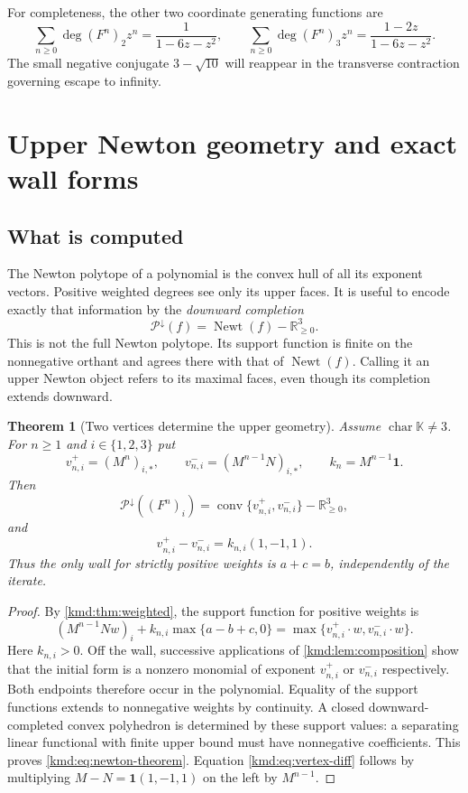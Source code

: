 \documentclass[11pt,a4paper]{article}
\numberwithin{equation}{section}
\newtheorem{theorem}{Theorem}[section]
\theoremstyle{definition}
\theoremstyle{remark}
\newcommand{\K}{\mathbb K}
\newcommand{\R}{\mathbb R}
\newcommand{\one}{\mathbf 1}
\newcommand{\dd}{\operatorname{deg}}
\newcommand{\Newt}{\operatorname{Newt}}
\newcommand{\conv}{\operatorname{conv}}
\DeclareMathOperator{\charac}{char}
\begin{document}
For completeness, the other two coordinate generating functions are
\[
 \sum_{n\ge0}\dd(F^n)_2z^n=\frac1{1-6z-z^2},\qquad
 \sum_{n\ge0}\dd(F^n)_3z^n=\frac{1-2z}{1-6z-z^2}.
\]
The small negative conjugate $3-\sqrt{10}$ will reappear in the
transverse contraction governing escape to infinity.

\section{Upper Newton geometry and exact wall forms}\label{kmd:sec:newton}

\subsection{What is computed}
The Newton polytope of a polynomial is the convex hull of all its
exponent vectors. Positive weighted degrees see only its upper
faces. It is useful to encode exactly that information by the
\emph{downward completion}
\begin{equation}
 \mathcal P^\downarrow(f)=\Newt(f)-\R_{\ge0}^3.
 \label{kmd:eq:downward}
\end{equation}
This is not the full Newton polytope. Its support function is finite
on the nonnegative orthant and agrees there with that of
$\Newt(f)$. Calling it an upper Newton object refers to its maximal
faces, even though its completion extends downward.

\begin{theorem}[Two vertices determine the upper geometry]\label{kmd:thm:newton}
Assume $\charac\K\ne3$. For $n\ge1$ and $i\in\{1,2,3\}$ put
\begin{equation}
 v^+_{n,i}=(M^n)_{i,*},\qquad
 v^-_{n,i}=(M^{n-1}N)_{i,*},\qquad k_n=M^{n-1}\one.
 \label{kmd:eq:vertices}
\end{equation}
Then
\begin{equation}
 \mathcal P^\downarrow((F^n)_i)
 =\conv\{v^+_{n,i},v^-_{n,i}\}-\R_{\ge0}^3,
 \label{kmd:eq:newton-theorem}
\end{equation}
and
\begin{equation}
 v^+_{n,i}-v^-_{n,i}=k_{n,i}(1,-1,1).
 \label{kmd:eq:vertex-diff}
\end{equation}
Thus the only wall for strictly positive weights is $a+c=b$,
independently of the iterate.
\end{theorem}
\begin{proof}
By \cref{kmd:thm:weighted}, the support function for positive weights is
\[
 (M^{n-1}Nw)_i+k_{n,i}\max\{a-b+c,0\}
 =\max\{v^+_{n,i}\cdot w,v^-_{n,i}\cdot w\}.
\]
Here $k_{n,i}>0$. Off the wall, successive applications of
\cref{kmd:lem:composition} show that the initial form is a nonzero
monomial of exponent $v^+_{n,i}$ or $v^-_{n,i}$ respectively. Both
endpoints therefore occur in the polynomial. Equality of the
support functions extends to nonnegative weights by continuity.
A closed downward-completed convex polyhedron is determined by these
support values: a separating linear functional with finite upper
bound must have nonnegative coefficients. This proves
\eqref{kmd:eq:newton-theorem}. Equation \eqref{kmd:eq:vertex-diff} follows
by multiplying $M-N=\one(1,-1,1)$ on the left by $M^{n-1}$.
\end{proof}
\end{document}
